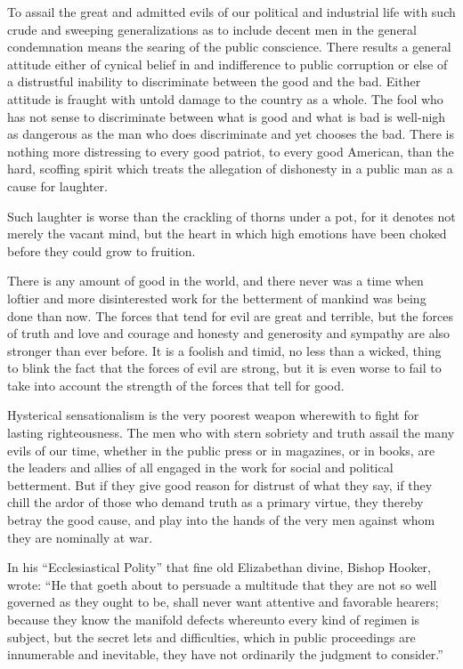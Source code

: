 \documentclass[a4paper]{amsbook}
\begin{document}
To assail the great and admitted evils of our political and industrial life with such crude and sweeping generalizations as to include decent men in the general condemnation means the searing of the public conscience. There results a general attitude either of cynical belief in and indifference to public corruption or else of a distrustful inability to discriminate between the good and the bad. Either attitude is fraught with untold damage to the country as a whole. The fool who has not sense to discriminate between what is good and what is bad is well-nigh as dangerous as the man who does discriminate and yet chooses the bad. There is nothing more distressing to every good patriot, to every good American, than the hard, scoffing spirit which treats the allegation of dishonesty in a public man as a cause for laughter.

Such laughter is worse than the crackling of thorns under a pot, for it denotes not merely the vacant mind, but the heart in which high emotions have been choked before they could grow to fruition.

There is any amount of good in the world, and there never was a time when loftier and more disinterested work for the betterment of mankind was being done than now. The forces that tend for evil are great and terrible, but the forces of truth and love and courage and honesty and generosity and sympathy are also stronger than ever before. It is a foolish and timid, no less than a wicked, thing to blink the fact that the forces of evil are strong, but it is even worse to fail to take into account the strength of the forces that tell for good.

Hysterical sensationalism is the very poorest weapon wherewith to fight for lasting righteousness. The men who with stern sobriety and truth assail the many evils of our time, whether in the public press or in magazines, or in books, are the leaders and allies of all engaged in the work for social and political betterment. But if they give good reason for distrust of what they say, if they chill the ardor of those who demand truth as a primary virtue, they thereby betray the good cause, and play into the hands of the very men against whom they are nominally at war.

In his “Ecclesiastical Polity” that fine old Elizabethan divine, Bishop Hooker, wrote: “He that goeth about to persuade a multitude that they are not so well governed as they ought to be, shall never want attentive and favorable hearers; because they know the manifold defects whereunto every kind of regimen is subject, but the secret lets and difficulties, which in public proceedings are innumerable and inevitable, they have not ordinarily the judgment to consider.”
\end{document}
